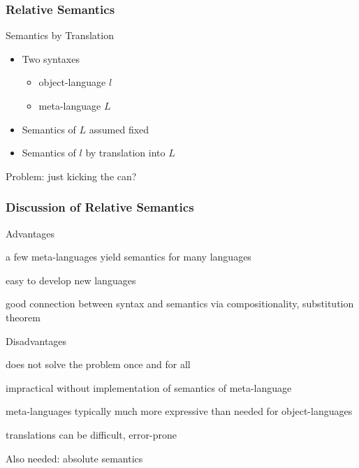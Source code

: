 \begin{frame}\frametitle{Relative Semantics}
Semantics by Translation
\begin{itemize}
\item Two syntaxes
\begin{itemize}
\item object-language $l$ 
\item meta-language $L$ 
\end{itemize}
\item Semantics of $L$ assumed fixed
\item Semantics of $l$ by translation into $L$
\end{itemize}

Problem: just kicking the can?
\end{frame}

\begin{frame}\frametitle{Discussion of Relative Semantics}
\begin{blockitems}{Advantages}
\item a few meta-languages yield semantics for many languages
\item easy to develop new languages
\item good connection between syntax and semantics via compositionality, substitution theorem
\end{blockitems}

\begin{blockitems}{Disadvantages}
\item does not solve the problem once and for all
\item impractical without implementation of semantics of meta-language
\item meta-languages typically much more expressive than needed for object-languages
\item translations can be difficult, error-prone
\end{blockitems}

Also needed: absolute semantics
\end{frame}


